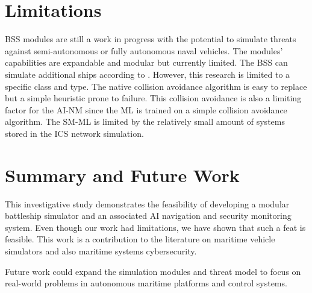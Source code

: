 \documentclass[conference]{IEEEtran}
\begin{document}
 



\section{Limitations}
BSS modules are still a work in progress with the potential to simulate threats against semi-autonomous or fully autonomous naval vehicles. The modules' capabilities are expandable and modular but currently limited. The BSS can simulate additional ships according to \cite{b4}. However, this research is limited to a specific class and type. The native collision avoidance algorithm is easy to replace but a simple heuristic prone to failure. This collision avoidance is also a limiting factor for the AI-NM since the ML is trained on a simple collision avoidance algorithm. The SM-ML is limited by the relatively small amount of systems stored in the ICS network simulation.


\section{Summary and Future Work}
This investigative study demonstrates the feasibility of developing a modular battleship simulator and an associated AI navigation and security monitoring system. Even though our work had limitations, we have shown that such a feat is feasible. This work is a contribution to the literature on maritime vehicle simulators and also maritime systems cybersecurity.

Future work could expand the simulation modules and threat model to focus on real-world problems in autonomous maritime platforms and control systems. 

\end{document}
